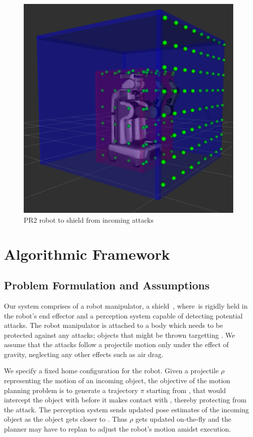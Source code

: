 \documentclass[a4paper]{report}
\begin{document}
\begin{figure}[H]
\centering
\includegraphics[width=0.8\columnwidth]{domes_disc}
\caption{PR2 robot to shield from incoming attacks}
\label{fig:shield_pr2}
\end{figure}

\section{Algorithmic Framework}
\subsection{Problem Formulation and Assumptions}
Our system comprises of a robot manipulator, a shield~\calS, where~\calS is rigidly held in the robot's end effector and a perception system capable of detecting potential attacks. The robot manipulator is attached to a body \calB which needs to be protected against any attacks; objects that might be thrown targetting \calB. We assume that the attacks follow a projectile motion only under the effect of gravity, neglecting any other effects such as air drag.

We specify a fixed home configuration \Shome for the robot. Given a projectile $\rho$ representing the motion of an incoming object, the objective of the motion planning problem is to generate a trajectory $\pi$ starting from \Shome, that would intercept the object with \calS before it makes contact with \calB, thereby protecting \calB from the attack.
%
The perception system sends updated pose estimates of the incoming object as the object gets closer to \calB. Thus $\rho$ gets updated on-the-fly and the planner may have to replan to adjust the robot's motion amidst execution.
\end{document}

